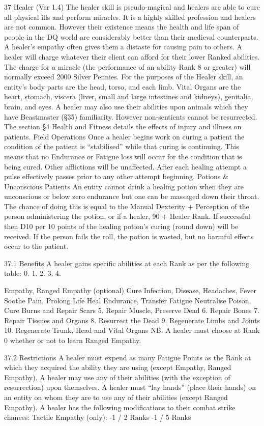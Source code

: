 \documentclass[a4paper]{article}
\begin{document}
\begin{multicols}{3}
37 Healer (Ver 1.4)
The healer skill is pseudo-magical and healers are
able to cure all physical ills and perform miracles.
It is a highly skilled profession and healers are not
common. However their existence means the
health and life span of people in the DQ world are
considerably better than their medieval counterparts.
A healer’s empathy often gives them a distaste for
causing pain to others.
A healer will charge whatever their client can
afford for their lower Ranked abilities. The charge
for a miracle (the performance of an ability Rank 8
or greater) will normally exceed 2000 Silver Pennies.
For the purposes of the Healer skill, an entity’s
body parts are the head, torso, and each limb. Vital
Organs are the heart, stomach, viscera (liver, small
and large intestines and kidneys), genitalia, brain,
and eyes.
A healer may also use their abilities upon animals
which they have Beastmaster (§35) familiarity.
However non-sentients cannot be resurrected.
The section §4 Health and Fitness details the effects of injury and illness on patients.
Field Operations
Once a healer begins work on curing a patient the
condition of the patient is “stabilised” while that
curing is continuing. This means that no Endurance
or Fatigue loss will occur for the condition that is
being cured. Other afflictions will be unaffected.
After each healing attempt a pulse effectively
passes prior to any other attempt beginning.
Potions & Unconscious Patients
An entity cannot drink a healing potion when they
are unconscious or below zero endurance but one
can be massaged down their throat. The chance of
doing this is equal to the Manual Dexterity + Perception of the person administering the potion, or if
a healer, 90 + Healer Rank. If successful then D10
per 10 points of the healing potion’s curing (round
down) will be received. If the person fails the roll,
the potion is wasted, but no harmful effects occur
to the patient.

37.1 Benefits
A healer gains specific abilities at each Rank as per
the following table:
0.
1.
2.
3.
4.

Empathy, Ranged Empathy (optional)
Cure Infection, Disease, Headaches, Fever
Soothe Pain, Prolong Life
Heal Endurance, Transfer Fatigue
Neutralise Poison, Cure Burns and Repair
Scars
5.
Repair Muscle, Preserve Dead
6.
Repair Bones
7.
Repair Tissues and Organs
8.
Resurrect the Dead
9.
Regenerate Limbs and Joints
10. Regenerate Trunk, Head and Vital Organs
NB. A healer must choose at Rank 0 whether or
not to learn Ranged Empathy.

37.2 Restrictions
A healer must expend as many Fatigue Points as
the Rank at which they acquired the ability they are
using (except Empathy, Ranged Empathy).
A healer may use any of their abilities (with the
exception of resurrection) upon themselves.
A healer must “lay hands” (place their hands) on
an entity on whom they are to use any of their
abilities (except Ranged Empathy).
A healer has the following modifications to their
combat strike chances:
Tactile Empathy (only):
-1 / 2 Ranks
-1 / 5 Ranks


\end{multicols}
\end{document}

